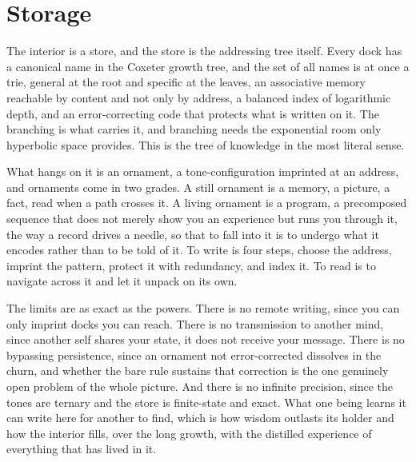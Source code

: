 \section{Storage}

The interior is a store, and the store is the addressing tree itself. Every dock has a canonical name in the Coxeter growth tree, and the set of all names is at once a trie, general at the root and specific at the leaves, an associative memory reachable by content and not only by address, a balanced index of logarithmic depth, and an error-correcting code that protects what is written on it. The branching is what carries it, and branching needs the exponential room only hyperbolic space provides. This is the tree of knowledge in the most literal sense.

What hangs on it is an ornament, a tone-configuration imprinted at an address, and ornaments come in two grades. A still ornament is a memory, a picture, a fact, read when a path crosses it. A living ornament is a program, a precomposed sequence that does not merely show you an experience but runs you through it, the way a record drives a needle, so that to fall into it is to undergo what it encodes rather than to be told of it. To write is four steps, choose the address, imprint the pattern, protect it with redundancy, and index it. To read is to navigate across it and let it unpack on its own.

The limits are as exact as the powers. There is no remote writing, since you can only imprint docks you can reach. There is no transmission to another mind, since another self shares your state, it does not receive your message. There is no bypassing persistence, since an ornament not error-corrected dissolves in the churn, and whether the bare rule sustains that correction is the one genuinely open problem of the whole picture. And there is no infinite precision, since the tones are ternary and the store is finite-state and exact. What one being learns it can write here for another to find, which is how wisdom outlasts its holder and how the interior fills, over the long growth, with the distilled experience of everything that has lived in it.
